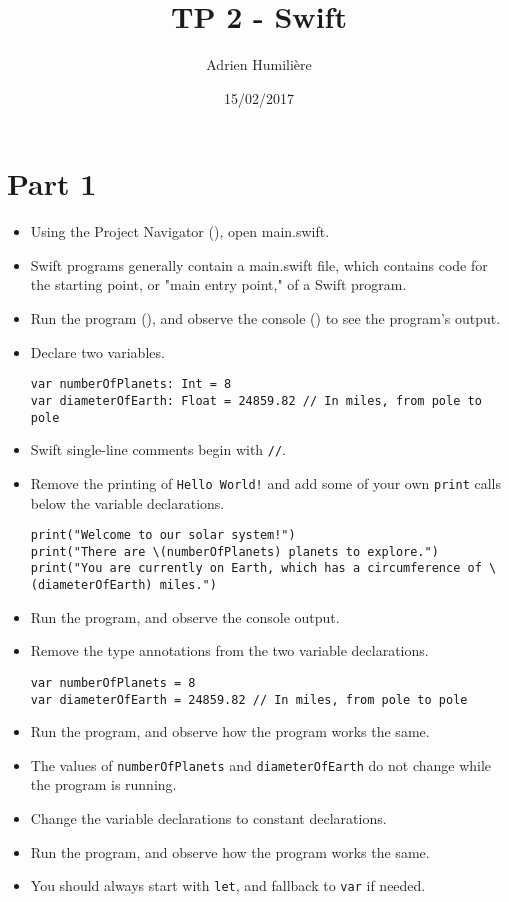 \documentclass[a4paper,11pt]{scrartcl}
\begin{document}
\newcommand{\mytitle}{TP 2 - Swift}
\title{\mytitle}
\author{Adrien Humilière}
\date{15/02/2017}

\maketitle

\section*{Part 1}

\begin{itemize}
\item Using the Project Navigator (), open main.swift.
\item Swift programs generally contain a main.swift file, which contains code for the starting point, or "main entry point," of a Swift program.
\item Run the program (), and observe the console () to see the program's output.
\item Declare two variables.
\begin{lstlisting}
var numberOfPlanets: Int = 8
var diameterOfEarth: Float = 24859.82 // In miles, from pole to pole
\end{lstlisting}
\item Swift single-line comments begin with \texttt{//}.
\item Remove the printing of \texttt{Hello World!} and add some of your own \texttt{print} calls below the variable declarations.
\begin{lstlisting}
print("Welcome to our solar system!")
print("There are \(numberOfPlanets) planets to explore.")
print("You are currently on Earth, which has a circumference of \(diameterOfEarth) miles.")
\end{lstlisting}
\item Run the program, and observe the console output.
\item Remove the type annotations from the two variable declarations.
\begin{lstlisting}
var numberOfPlanets = 8
var diameterOfEarth = 24859.82 // In miles, from pole to pole
\end{lstlisting}
\item Run the program, and observe how the program works the same.
\item The values of \texttt{numberOfPlanets} and \texttt{diameterOfEarth} do not change while the program is running.
\item Change the variable declarations to constant declarations.
\item Run the program, and observe how the program works the same.
\item You should always start with \texttt{let}, and fallback to \texttt{var} if needed.
\end{itemize}
\end{document}
